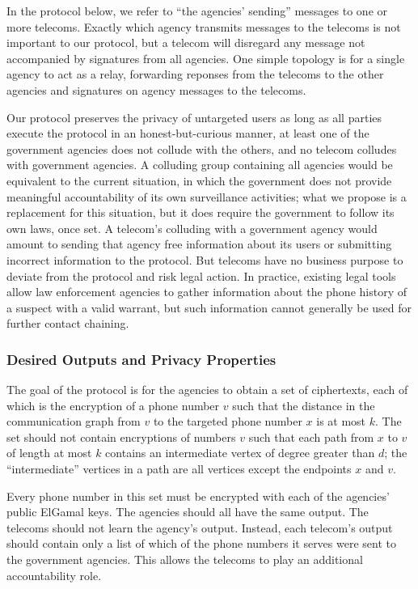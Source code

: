 In the protocol below, we refer to ``the agencies' sending'' messages to one or more telecoms. Exactly which agency transmits messages to the telecoms is not important to our protocol, but a telecom will disregard any message not accompanied by signatures from all agencies. One simple topology is for a single agency to act as a relay, forwarding reponses from the telecoms to the other agencies and signatures on agency messages to the telecoms.



Our protocol preserves the privacy of untargeted users as long as all parties execute the protocol in an honest-but-curious manner, 
at least one of the government agencies does not collude with the others, and no telecom colludes with government agencies. 
A colluding group containing all agencies would be equivalent to the current situation, in which the government does not provide meaningful accountability of its own surveillance activities; what we propose is a replacement for this situation, but it does require the government to follow its own laws, once set. 
A telecom's colluding with a government agency would amount to sending that agency free information about its users or submitting incorrect information to the protocol. But telecoms have no business purpose to deviate from the protocol and risk legal action. In practice, existing legal tools allow law enforcement agencies to gather information about the phone history of a suspect with a valid warrant, but such information cannot generally be used for further contact chaining.

\subsubsection{Desired Outputs and Privacy Properties}

The goal of the protocol is for the agencies to obtain a set of ciphertexts, each of which is the encryption of a phone number $v$ such that the distance in the communication graph from $v$ to the targeted phone number $x$ is at most $k$. The set should not contain encryptions of numbers $v$ such that each path from $x$ to $v$ of length at most $k$ contains an intermediate vertex of degree greater than $d$; the ``intermediate'' vertices in a path are all vertices except the endpoints $x$ and $v$.



Every phone number in this set must be encrypted with each of the agencies' public ElGamal keys. The agencies should all have the same output.
The telecoms should not learn the agency's output. Instead, each telecom's output should contain only a list of which of the phone numbers it serves were sent to the government agencies. This allows the telecoms to play an additional accountability role. 

